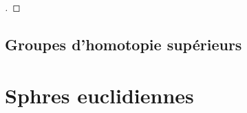 \begin{proof}[\tr]
\end{proof}

\subsection{Groupes d'homotopie sup\'erieurs}







\section{Sphres euclidiennes}
